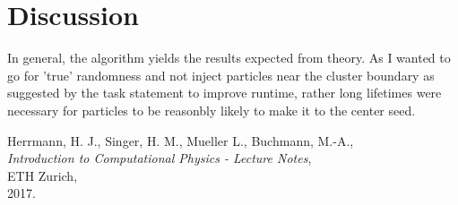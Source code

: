 \documentclass[11pt,a4paper]{article}
\begin{document}
\section{Discussion}
In general, the algorithm yields the results expected from theory. As I wanted to go for 'true' randomness and not inject
particles near the cluster boundary as suggested by the task statement to improve runtime, rather long lifetimes were necessary for particles to be
reasonbly likely to make it to the center seed.


\pagebreak
\begin{thebibliography}{99}


	Herrmann, H. J.,
	Singer, H. M.,
	Mueller L.,
	Buchmann, M.-A.,\\
	\emph{Introduction to Computational Physics - Lecture Notes},\\
	ETH Zurich,\\
	2017.


\end{thebibliography}
\end{document}

